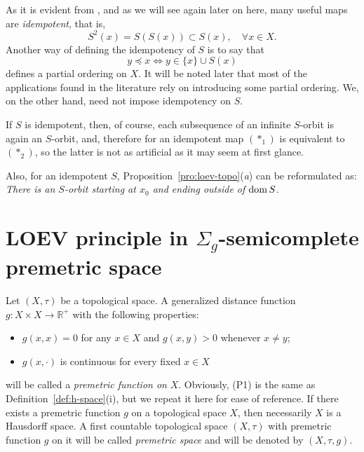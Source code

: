\documentclass[12pt]{article}
\def\dom{\mathop{\rm dom}}
\newcommand{\astone}{(\ast_1)}
\newcommand{\astwo}{(\ast_2)}
\newcommand{\R}{\mathbb{R}}
\begin{document}
As it is evident from \cite{Ivanov-Zlateva}, and as we will see again later on here, many useful maps are \emph{idempotent}, that is,
\begin{equation}
    \label{eq:mono}
    S^2(x) = S(S(x)) \subset S(x),\quad \forall x\in X.
\end{equation}
Another way of defining the idempotency of $S$ is to say that
$$
    y \preceq x \iff y \in \{x\}\cup S(x)
$$
defines a partial ordering on $X$. It will be noted later that most of the applications found in the literature rely on introducing some partial ordering. We, on the other hand, need not impose idempotency on $S$. 

If $S$ is idempotent, then, of course, each subsequence of an infinite $S$-orbit is again an $S$-orbit, and, therefore for an idempotent map $\astone$ is equivalent to $\astwo$, so the latter is not as artificial as it may seem at first glance.

Also, for an idempotent $S$, Proposition~\ref{pro:loev-topo}(\emph{a}) can be reformulated as: \emph{There is an $S$-orbit starting at $x_0$ and ending outside of $\dom S$}.



\section{LOEV principle in  $\Sigma_g$-semicomplete  premetric space}\label{sec:semicomplete}

Let $(X,\tau)$ be a  topological space. A generalized distance function $g:X \times X \rightarrow \R^+$ with the following properties:
\begin{itemize}
     \item[{\rm (P1)}] $g(x,x)=0$ for any $x\in X$ and $g(x,y) > 0$ whenever $x \neq y$;
     \item[{\rm (P2)}] $g(x, \cdot)$ is continuous for every fixed $x\in X$
\end{itemize}
will be called a \emph{premetric function on} $X$. Obviously, (P1) is the same as    Definition~\ref{def:h-space}(i), but we repeat it here for ease of reference. If there exists a premetric function $g$ on a topological space $X$, then  necessarily $X$  is a Hausdorff space. A first countable topological space $(X,\tau)$ with premetric function $g$ on it will be called \emph{premetric space} and will be denoted by $(X,\tau,g)$.
\end{document}
